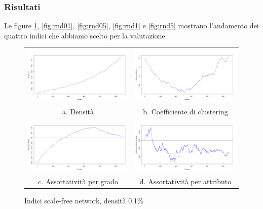 \documentclass[a4paper,12pt]{article}
\begin{document}
\subsubsection{Risultati}
Le figure \ref{fig:sf1}, \ref{fig:rnd01}, \ref{fig:rnd05}, \ref{fig:rnd1} e \ref{fig:rnd5} mostrano l'andamento dei quattro indici che abbiamo scelto per la valutazione.
\begin{figure}[h]
\begin{tabular}{cc}
  \includegraphics[width=83mm]{images/evolution_1000_sf_1080_0.pdf} &   \includegraphics[width=83mm]{images/clustering_1000_sf_1080_0.pdf} \\
a. Densità & b. Coefficiente di clustering \\[6pt]
 \includegraphics[width=83mm]{images/deg_assortativity_1000_sf_1080_0.pdf} &   \includegraphics[width=83mm]{images/homophily_1000_sf_1080_0.pdf} \\
c. Assortatività per grado & d. Assortatività per attributo \\[6pt]
\end{tabular}
\caption{Indici scale-free network, densità 0.1\%}
\label{fig:sf1}
\end{figure}
\end{document}

